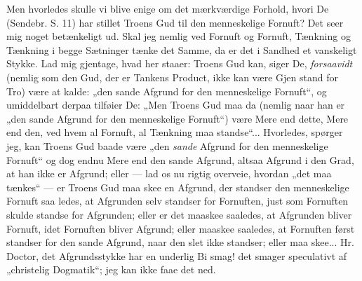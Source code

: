 \documentclass[12pt,a4paper]{article}
\begin{document}
Men hvorledes skulle vi blive enige om det mærkværdige
Forhold, hvori De (Sendebr. S. 11) har stillet Troens Gud
til den menneskelige Fornuft? Det seer mig noget betænkeligt
ud. Skal jeg nemlig ved Fornuft og Fornuft, Tænkning og
Tænkning i begge Sætninger tænke det Samme, da er det
i Sandhed et vanskeligt Stykke. Lad mig gjentage, hvad
her staaer: Troens Gud kan, siger De, \emph{forsaavidt} (nemlig
som den Gud, der er Tankens Product, ikke kan være Gjen\-%
stand for Tro) være at kalde: „den sande Afgrund for den
menneskelige Fornuft“, og umiddelbart derpaa tilføier De:
„Men Troens Gud maa da (nemlig naar han er „den sande
Afgrund for den menneskelige Fornuft“) være Mere end dette,
Mere end den, ved hvem al Fornuft, al Tænkning maa
standse“... Hvorledes, spørger jeg, kan Troens Gud baade
være „den \emph{sande} Afgrund for den menneskelige Fornuft“ og
dog endnu Mere end den sande Afgrund, altsaa Afgrund i
den Grad, at han ikke er Afgrund; eller --- lad os nu rigtig
overveie, hvordan „det maa tænkes“ --- er Troens Gud maa\-%
skee en Afgrund, der standser den menneskelige Fornuft saa\-%
ledes, at Afgrunden selv standser for Fornuften, just som
Fornuften skulde standse for Afgrunden; eller er det maaskee
saaledes, at Afgrunden bliver Fornuft, idet Fornuften bliver
Afgrund; eller maaskee saaledes, at Fornuften først standser
for den sande Afgrund, naar den slet ikke standser; eller maa\-%
skee... Hr. Doctor, det Afgrundsstykke har en underlig Bi\-%
smag! det smager speculativt af „christelig Dogmatik“; jeg
kan ikke faae det ned.
\end{document}
